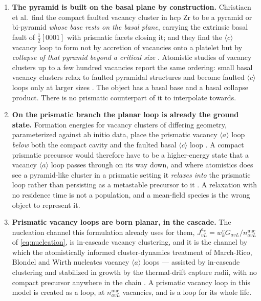 \documentclass{article}
\newcommand{\aloop}{\ensuremath{\langle a\rangle}}
\newcommand{\cloop}{\ensuremath{\langle c\rangle}}
\begin{document}
\begin{enumerate}
\item \textbf{The pyramid is built on the basal plane by construction.}
      Christiaen et al.\ find the compact faulted vacancy cluster in hcp Zr to be
      a pyramid or bi-pyramid \emph{whose base rests on the basal plane},
      carrying the extrinsic basal fault of $\tfrac12[0001]$ with prismatic
      facets closing it; and they find the \cloop{} vacancy loop to form not by
      accretion of vacancies onto a platelet but by \emph{collapse of that
      pyramid beyond a critical size} \citep{christiaen2019new}. Atomistic
      studies of vacancy clusters up to a few hundred vacancies report the same
      ordering: small basal vacancy clusters relax to faulted pyramidal
      structures and become faulted \cloop{} loops only at larger sizes
      \citep{dediego2008structure,varvenne2014vacancy}. The object has a basal
      base and a basal collapse product. There is no prismatic counterpart of it
      to interpolate towards.
\item \textbf{On the prismatic branch the planar loop is already the ground
      state.} Formation energies for vacancy clusters of differing geometry,
      parameterized against ab initio data, place the prismatic vacancy \aloop{}
      loop \emph{below} both the compact cavity and the faulted basal \cloop{}
      loop \citep{varvenne2014vacancy}. A compact prismatic precursor would
      therefore have to be a higher-energy state that a vacancy \aloop{} loop
      passes through on its way down, and where atomistics does see a pyramid-like
      cluster in a prismatic setting it \emph{relaxes into} the prismatic loop
      rather than persisting as a metastable precursor to it
      \citep{dediego2008structure}. A relaxation with no residence time is not a
      population, and a mean-field species is the wrong object to represent it.
\item \textbf{Prismatic vacancy loops are born planar, in the cascade.} The
      nucleation channel this formulation already uses for them,
      $J^{a_k}_{vL}=w^v_kG_{avL}/n^{\mathrm{nuc}}_{avL}$ of
      \cref{eq:nucleation}, is in-cascade vacancy clustering, and it is the
      channel by which the atomistically informed cluster-dynamics treatment of
      March-Rico, Blondel and Wirth nucleates vacancy \aloop{} loops --- assisted
      by in-cascade clustering and stabilized in growth by the thermal-drift
      capture radii, with no compact precursor anywhere in the chain
      \citep{marchrico2025}. A prismatic vacancy loop in this model is created as
      a loop, at $n^{\mathrm{nuc}}_{avL}$ vacancies, and is a loop for its whole
      life.
\end{enumerate}
\end{document}

